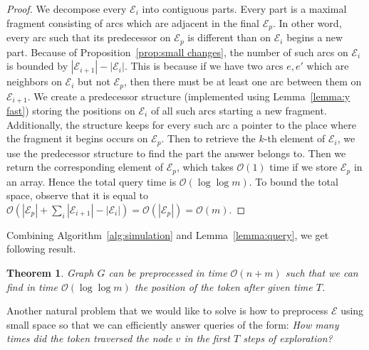 \documentclass{article}[11pt,letter]
\newtheorem{theorem}[definition]{Theorem}
\newcommand{\bigo}{\mathcal{O}}
\newcommand{\walk}{\mathcal{E}}
\begin{document}
\begin{proof}
We decompose every $\walk_i$ into contiguous parts. Every part is a maximal fragment consisting of arcs which are adjacent in the final $\walk_p$. In other word, every arc such that its
predecessor on $\walk_p$ is different than on $\walk_i$ begins a new part. Because of Proposition~\ref{prop:small changes}, the number of such arcs on $\walk_i$ is bounded by $|\walk_{i+1}|-|\walk_i|$.
This is because if we have two arcs $e,e'$ which are neighbors on $\walk_i$ but not $\walk_p$, then there must be at least one arc between them on $\walk_{i+1}$. We create a predecessor
structure (implemented using Lemma~\ref{lemma:y fast}) storing the positions on $\walk_i$ of all such arcs starting a new fragment.
Additionally, the structure keeps for every such arc a pointer to the place where the fragment it begins occurs on $\walk_p$.
Then to retrieve the $k$-th element of $\walk_i$, we use the predecessor structure to find the part the answer belongs to. Then we return the corresponding element of $\walk_p$, which
takes $\bigo(1)$ time if we store $\walk_p$ in an array. Hence the total query time is $\bigo(\log\log m)$. To bound the total space, observe that it is equal to $\bigo(|\walk_p|+\sum_i |\walk_{i+1}|-|\walk_i|)=\bigo(|\walk_p|)=\bigo(m)$.

\end{proof}

Combining Algorithm~\ref{alg:simulation} and Lemma~\ref{lemma:query}, we get following result.
\begin{theorem}
\label{th:queries1}
Graph $G$ can be preprocessed in time $\bigo(n+m)$ such that we can find in time $\bigo(\log\log m)$ the position of the token after given time $T$.
\end{theorem}

Another natural problem that we would like to solve is how to preprocess $\walk$ using small space so that we can efficiently answer queries of the form: \emph{How many times did the token traversed the node $v$ in the first $T$ steps of exploration?}
\end{document}
